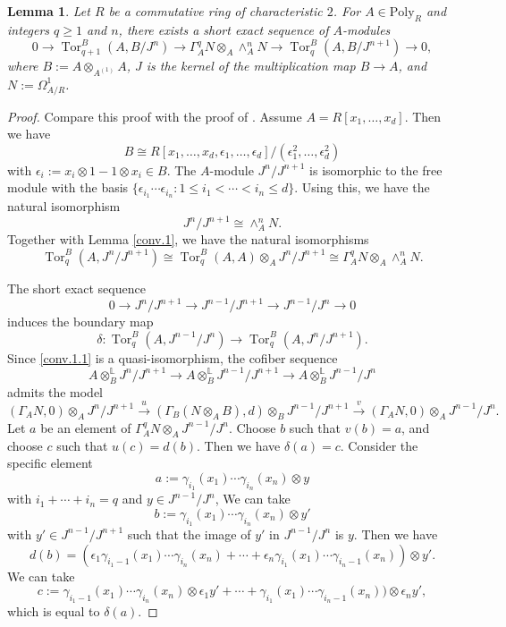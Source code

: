 \documentclass[10pt]{amsart}
\newtheorem{lem}[thm]{Lemma}
\theoremstyle{definition}
\numberwithin{equation}{section}
\renewcommand{\L}{\mathbb{L}}
\newcommand{\Poly}{\mathrm{Poly}}
\DeclareMathOperator{\Tor}{\mathrm{Tor}}
\begin{document}
{\begin{lem}
\label{conv.2}
Let $R$ be a commutative ring of characteristic $2$.
For $A\in \Poly_R$ and integers $q\geq 1$ and $n$,
there exists a short exact sequence of $A$-modules
\[
0
\to
\Tor_{q+1}^B(A,B/J^n)
\to
\Gamma_A^qN \otimes_A \wedge_A^n N
\to
\Tor_q^B(A,B/J^{n+1})
\to
0,
\]
where $B:=A\otimes_{A^{(1)}}A$, $J$ is the kernel of the multiplication map $B\to A$,
and $N:=\Omega_{A/R}^1$.
\end{lem}
\begin{proof}
Compare this proof with the proof of \cite[Proposition 8.7]{Qui}.
Assume $A=R[x_1,\ldots,x_d]$.
Then we have 
\[
B\cong R[x_1,\ldots,x_d,\epsilon_1,\ldots,\epsilon_d]/(\epsilon_1^2,\ldots,\epsilon_d^2)
\]
with $\epsilon_i:=x_i\otimes 1-1\otimes x_i\in B$.
The $A$-module $J^n/J^{n+1}$ is isomorphic to the free module with the basis $\{\epsilon_{i_1}\cdots \epsilon_{i_n}:1\leq i_1<\cdots<i_n\leq d\}$.
Using this,
we have the natural isomorphism
\begin{equation}
\label{conv.2.1}
J^n/J^{n+1}
\cong
\wedge_A^n N.
\end{equation}
Together with Lemma \ref{conv.1},
we have the natural isomorphisms
\begin{equation}
\label{conv.2.2}
\Tor_q^B(A,J^n/J^{n+1})
\cong
\Tor_q^B(A,A)\otimes_A J^n/J^{n+1}
\cong
\Gamma_A^q N
\otimes_A
\wedge_A^n N.
\end{equation}

The short exact sequence
\[
0\to J^{n}/J^{n+1}\to J^{n-1}/J^{n+1}\to J^{n-1}/J^n\to 0
\]
induces the boundary map
\[
\delta\colon \Tor_q^B(A,J^{n-1}/J^n)\to \Tor_q^B(A,J^n/J^{n+1}).
\]
Since \eqref{conv.1.1} is a quasi-isomorphism,
the cofiber sequence
\[
A\otimes_B^\L J^n/J^{n+1}
\to
A\otimes_B^\L J^{n-1}/J^{n+1}
\to
A\otimes_B^\L J^{n-1}/J^n
\]
admits the model
\[
(\Gamma_A N,0)\otimes_A J^n/J^{n+1}
\xrightarrow{u}
(\Gamma_B(N\otimes_A B),d)\otimes_B J^{n-1}/J^{n+1}
\xrightarrow{v}
(\Gamma_A N,0)\otimes_A J^{n-1}/J^{n}.
\]
Let $a$ be an element of $\Gamma_A^q N\otimes_A J^{n-1}/J^n$.
Choose $b$ such that $v(b)=a$, and choose $c$ such that $u(c)=d(b)$.
Then we have $\delta(a)=c$.
Consider the specific element
\[
a:=\gamma_{i_1}(x_1)\cdots \gamma_{i_n}(x_n)\otimes y
\]
with $i_1+\cdots+i_n=q$ and $y\in J^{n-1}/J^n$,
We can take
\[
b:=\gamma_{i_1}(x_1)\cdots \gamma_{i_n}(x_n)\otimes y'
\]
with $y'\in J^{n-1}/J^{n+1}$ such that the image of $y'$ in $J^{n-1}/J^n$ is $y$.
Then we have
\[
d(b)=
(\epsilon_1\gamma_{i_1-1}(x_1) \cdots \gamma_{i_n}(x_n)
+
\cdots
+
\epsilon_n\gamma_{i_1}(x_1) \cdots \gamma_{i_n-1}(x_n)) \otimes y'.
\]
We can take
\begin{equation}
\label{conv.2.3}
c:=\gamma_{i_1-1}(x_1) \cdots \gamma_{i_n}(x_n)\otimes \epsilon_1 y'
+
\cdots
+
\gamma_{i_1}(x_1) \cdots \gamma_{i_n-1}(x_n)) \otimes \epsilon_n y',
\end{equation}
which is equal to $\delta(a)$.



\end{proof}}
\end{document}
